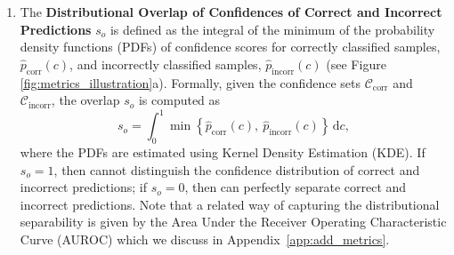 \begin{enumerate}[leftmargin=1.25em]
    \item The \textbf{Distributional Overlap of Confidences of Correct and Incorrect Predictions} $s_o$ is defined as the integral of the minimum of the probability density functions (PDFs) of confidence scores for correctly classified samples, $\hat{p}_{\text{corr}}(c)$, and incorrectly classified samples, $\hat{p}_{\text{incorr}}(c)$ (see Figure \ref{fig:metrics_illustration}a). Formally, given the confidence sets $\mathcal{C}_\text{corr}$ and $\mathcal{C}_\text{incorr}$, the overlap $s_o$ is computed as
\begin{equation}
    s_o = \int_{0}^{1} \min\left\{ \hat{p}_{\text{corr}}(c),\ \hat{p}_{\text{incorr}}(c) \right\} \, \mathrm{d}c,
\end{equation}
where the PDFs are estimated using Kernel Density Estimation (KDE). If $s_o = 1$, then \smallmodel cannot distinguish the confidence distribution of correct and incorrect predictions; if $s_o = 0$, then \smallmodel can perfectly separate correct and incorrect predictions. Note that a related way of capturing the distributional separability is given by the Area Under the Receiver Operating Characteristic Curve (AUROC) which we discuss in Appendix~\ref{app:add_metrics}.


\end{enumerate}
